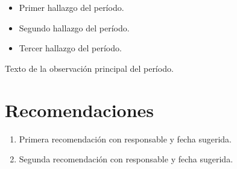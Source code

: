 \documentclass{../base/canon}
\begin{document}
\begin{itemize}
  \item Primer hallazgo del período.
  \item Segundo hallazgo del período.
  \item Tercer hallazgo del período.
\end{itemize}

\begin{ObservationBox}[Observación]
  Texto de la observación principal del período.
\end{ObservationBox}

\section{Recomendaciones}

\begin{enumerate}
  \item Primera recomendación con responsable y fecha sugerida.
  \item Segunda recomendación con responsable y fecha sugerida.
\end{enumerate}


\ContactSignature
\end{document}
